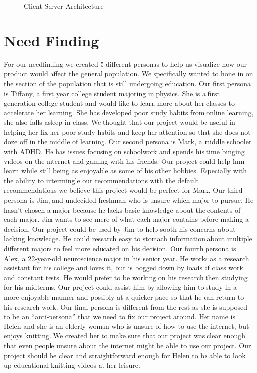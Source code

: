 \documentclass[letterpaper]{article} %
\begin{document}
\begin{figure}
	\caption{Client Server Architecture}
	\label{fig:client/server}
\end{figure}


\section{Need Finding}

For our needfinding we created 5 different personas to help us visualize how our product would affect the general population. We specifically wanted to hone in on the section of the population that is still undergoing education. Our first persona is Tiffany, a first year college student majoring in physics. She is a first generation college student and would like to learn more about her classes to accelerate her learning. She has developed poor study habits from online learning, she also falls asleep in class. We thought that our project would be useful in helping her fix her poor study habits and keep her attention so that she does not doze off in the middle of learning. Our second persona is Mark, a middle schooler with ADHD. He has issues focusing on schoolwork and spends his time binging videos on the internet and gaming with his friends. Our project could help him learn while still being as enjoyable as some of his other hobbies. Especially with the ability to intermingle our recommendations with the default recommendations we believe this project would be perfect for Mark. Our third persona is Jim, and undecided freshman who is unsure which major to pursue. He hasn't chosen a major because he lacks basic knowledge about the contents of each major. Jim wants to see more of what each major contains before making a decision. Our project could be used by Jim to help sooth his concerns about lacking knowledge. He could research easy to stomach information about multiple different majors to feel more educated on his decision. Our fourth persona is Alex, a 22-year-old neuroscience major in his senior year.  He works as a research assistant for his college and loves it, but is bogged down by loads of class work and constant tests. He would prefer to be working on his research then studying for his midterms. Our project could assist him by allowing him to study in a more enjoyable manner and possibly at a quicker pace so that he can return to his research work. Our final persona is different from the rest as she is supposed to be an “anti-persona” that we need to fix our project around. Her name is Helen and she is an elderly woman who is unsure of how to use the internet, but enjoys knitting. We created her to make sure that our project was clear enough that even people unsure about the internet might be able to use our project. Our project should be clear and straightforward enough for Helen to be able to look up educational knitting videos at her leisure.
\end{document}
